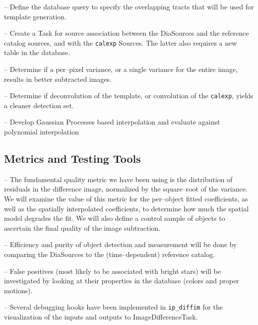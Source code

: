 \documentclass[prd, nofootinbib, floatfix, 11pt,tightenlines,times]{article}
\begin{document}

-- Define the database query to specify the overlapping tracts that
will be used for template generation.


-- Create a Task for source association between the DiaSources and the
reference catalog sources, and with the {\tt calexp} Sources.  The
latter also requires a new table in the database.


-- Determine if a per--pixel variance, or a single variance for the entire
image, results in better subtracted images.

-- Determine if deconvolution of the template, or convolution of the {\tt calexp},
yields a cleaner detection set.

-- Develop Gaussian Processes based interpolation and
evaluate against polynomial interpolation

\subsection{Metrics and Testing Tools}

-- The fundamental quality metric we have been using is the
distribution of residuals in the difference image, normalized by the
square--root of the variance.  We will examine the value of this
metric for the per--object fitted coefficients, as well as the
spatially interpolated coefficients, to determine how much the spatial
model degrades the fit.  We will also define a control sample of
objects to ascertain the final quality of the image subtraction.



-- Efficiency and purity of object detection and measurement will be
done by comparing the DiaSources to the (time--dependent) reference
catalog.

-- False positives (most likely to be associated with bright stars)
will be investigated by looking at their properties in the database
(colors and proper motions).

-- Several debugging hooks have been implemented in {\tt ip\_diffim} for
the visualization of the inputs and outputs to ImageDifferenceTask.
\end{document}
